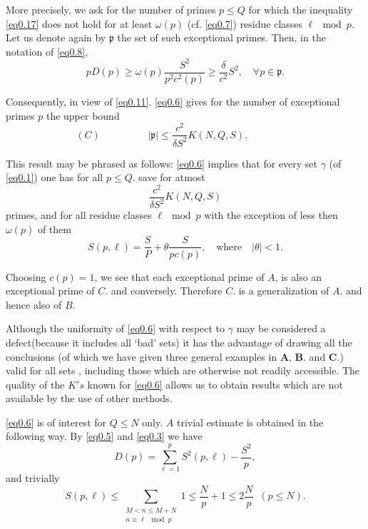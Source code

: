 More precisely,  we ask for the number of primes  $p\leq Q$ for  which
the  inequality \eqref{eq0.17} does  not hold for at least $\omega
(p)$ (cf. \eqref{eq0.7}) residue classes $\ell\mod p$. Let us denote
again by $\mathfrak{p}$ the set of such exceptional primes. Then, in the
notation of \eqref{eq0.8}, 
\begin{equation*}
 p D(p)\ge \omega(p) \frac{S^2}{p^2 c^2
 (p)}\ge \frac{\delta}{c^2}S^2, \quad 
 \forall p \in \mathfrak{p}.\tag{0.18}\label{eq0.18} 
 \end{equation*}
 
Consequently, in view of \eqref{eq0.11}. \eqref{eq0.6} gives for the number of
 exceptional primes $p$ the upper  bound 
\begin{equation*}
(C) \hspace{2cm}
 |\mathfrak{p}|\leq \frac{c^2}{\delta S^2}
  K(N,Q,S). \hspace{2cm}\tag{0.19}\label{eq0.19} 
\end{equation*}

This result may be phrased as follows: \eqref{eq0.6} implies that for every
set $\gamma$ (of \eqref{eq0.1}) one has for all $p\leq Q$. save for atmost 
$$
\frac{c^2}{\delta S^2}K(N,Q,S)
$$
primes, and for all residue classes $\ell \mod p$ with the exception
of less then $\omega (p)$ of them 
\begin{equation*}
S(p,\ell) = \frac{S}{P}+ \theta \frac{S}{p c (p)},\quad \text{where}\quad
|\theta| < 1.\tag{0.20}\label{eq0.20}  
\end{equation*}

Choosing $c(p)=1$, we see that each exceptional prime of $A$, is also
an exceptional prime of $C$. and conversely. Therefore $C$. is a
generalization of $A$. and hence also of $B$. 


Although the uniformity of \eqref{eq0.6}  with  respect to $\gamma$ may be
considered a defect\pageoriginale (because it includes all `bad' sets)
it has the 
advantage of drawing all the conclusions (of which we have given three
general examples in {\bf A}, {\bf B}.  and {\bf C}.) valid for all sets  ,
including    those which are otherwise not readily accessible. The
quality of the $K's$  known for \eqref{eq0.6} allows  us to  obtain
results which are not available by the use of other methods.  

\eqref{eq0.6} is of interest for $Q\leq N$ only. $A$ trivial estimate
is obtained in the following way. By \eqref{eq0.5} and  \eqref{eq0.3}
we have 
\begin{equation*}
D(p)= \sum ^p_{\ell =1} S^2(p ,\ell) - \frac{S^2}{p},\tag{0.21}\label{eq0.21}
\end{equation*}
and trivially
\begin{equation*}
S(p,\ell) \leq \sum_{\substack{M<n\leq M+N\\n \equiv \ell \mod p}}1\leq
\frac{N}{p} +1 \leq 2 \frac{N}{p} \;\; (p \leq N).\tag{0.22}\label{eq0.22} 
\end{equation*}

